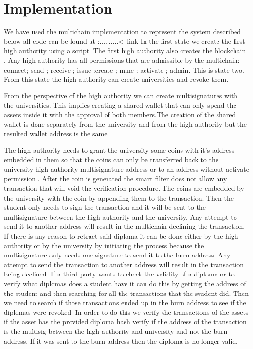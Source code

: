 \documentclass[conference]{IEEEtran}
\begin{document}
\section{Implementation}
We have used the multichain implementation to represent the system described below all code can be found at :..........<--link
In the first state we create the first high authority using a script. The first high authority also creates the blockchain . Any high authority has all permissions that are admissible by the multichain: connect; send ; receive ; issue ;create ; mine ; activate ; admin. This is state two. From this state the high authority can create universities and revoke them.\par
From the perspective of the high authority we can create multisignatures with the universities. This implies creating a shared wallet that can only spend the assets inside it with the approval of both members.The creation of the shared wallet is done separately from the university and from the high authority but the resulted wallet address is the same.\par
The high authority needs to grant the university some coins with it's address embedded in them so that the coins can only be transferred back to the university-high-authority multisignature address or to an address without activate permission . After the coin is generated the smart filter does not allow any transaction that will void the verification procedure. The coins are embedded by the university with the coin by appending them to the transaction. Then the student only needs to sign the transaction and it will be sent to the multisignature between the high authority and the university. Any attempt to send it to another address will result in the multichain declining the transaction. If there is any reason to retract said diploma it can be done either by the high-authority or by the university by initiating the process because the multisignature only needs one signature to send it to the burn address. Any attempt to send the transaction to another address will result in the transaction being declined.
If a third party wants to check the validity of a diploma or to verify what diplomas does a student have it can do this by getting the address of the student and then searching for all the transactions that the student did. Then we need to search if those transactions ended up in the burn address to see if the diplomas were revoked. In order to do this we verify the transactions of the assets if the asset has the provided diploma hash verify if the address of the transaction is the multisig between the high-authority and university and not the burn address. If it was sent to the burn address then the diploma is no longer valid.
\end{document}
